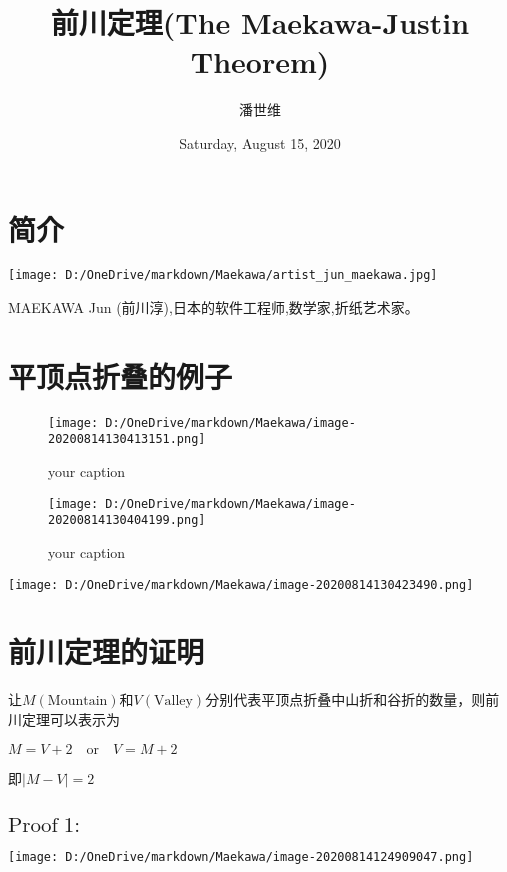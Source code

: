 \documentclass[a4paper,12pt]{article}
\begin{document}
\title {前川定理(The Maekawa-Justin Theorem)}
\author{潘世维}
\date{Saturday, August 15, 2020}
\maketitle
\section{简介} 
\texttt{[image: D:/OneDrive/markdown/Maekawa/artist\_jun\_maekawa.jpg]}

MAEKAWA Jun (前川淳),日本的软件工程师,数学家,折纸艺术家。

\section{平顶点折叠的例子}  


\begin{figure}[h]
\begin{minipage}[t]{0.2\linewidth}	
\centering
\texttt{[image: D:/OneDrive/markdown/Maekawa/image-20200814130413151.png]}	
\caption{your caption \label{your label}}  
\end{minipage}
\hfill
\begin{minipage}[t]{0.25\linewidth}
\centering
\texttt{[image: D:/OneDrive/markdown/Maekawa/image-20200814130404199.png]}
\caption{your caption\label{your label}}
\end{minipage}
\end{figure}
\begin{center}
    \texttt{[image: D:/OneDrive/markdown/Maekawa/image-20200814130423490.png]}
\end{center}


\section{前川定理的证明\cite{demaine2007geometric}}
让$M(\text{Mountain})$和$V(\text{Valley})$分别代表平顶点折叠中山折和谷折的数量，则前川定理可以表示为

$M = V +2 \quad \text{or}\quad V = M + 2$

即$|M-V|=2$

\subsection{$\text{Proof}\;1:$}
\begin{center}
\texttt{[image: D:/OneDrive/markdown/Maekawa/image-20200814124909047.png]}
\end{center}
\end{document}

